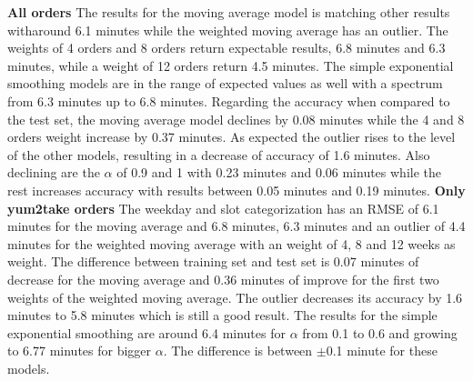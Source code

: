 \newline\newline\textbf{All orders}\newline
The results for the moving average model is matching other results witharound 6.1 minutes while the weighted moving average has an outlier. The weights of 4 orders and 8 orders return expectable results, 6.8 minutes and 6.3 minutes, while a weight of 12 orders return 4.5 minutes. The simple exponential smoothing models are in the range of expected values as well with a spectrum from 6.3 minutes up to 6.8 minutes. Regarding the accuracy when compared to the test set, the moving average model declines by 0.08 minutes while the 4 and 8 orders weight increase by 0.37 minutes. As expected the outlier rises to the level of the other models, resulting in a decrease of accuracy of 1.6 minutes. Also declining are the $\alpha$ of 0.9 and 1 with 0.23 minutes and 0.06 minutes while the rest increases accuracy with results between 0.05 minutes and 0.19 minutes.
\newline\newline\textbf{Only yum2take orders}\newline
The weekday and slot categorization has an RMSE of 6.1 minutes for the moving average and 6.8 minutes, 6.3 minutes and an outlier of 4.4 minutes for the weighted moving average with an weight of 4, 8 and 12 weeks as weight. The difference between training set and test set is 0.07 minutes of decrease for the moving average and 0.36 minutes of improve for the first two weights of the weighted moving average. The outlier decreases its accuracy by 1.6 minutes to 5.8 minutes which is still a good result. The results for the simple exponential smoothing are around 6.4 minutes for $\alpha$ from 0.1 to 0.6 and growing to 6.77 minutes for bigger $\alpha$. The difference is between $\pm$0.1 minute for these models.
